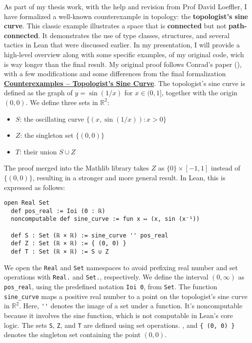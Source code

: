 As part of my thesis work, with the help and revision from Prof David Loeffler,
I have formalized a well-known counterexample in topology: the \textbf{topologist’s sine curve}.
This classic example illustrates a space that is \textbf{connected} but not \textbf{path-connected}.
It demonstrates the use of type classes, structures, and several tactics in Lean that were discussed earlier.
In my presentation, I will provide a high-level overview along with some specific examples,
of my original code, wich is way longer than the final result.
My original proof follows Conrad's paper (\cite{Conrad_connnotpathconn}), with a few modifications
and some differences from the final
formalization \href{https://leanprover-community.github.io/mathlib4_docs/Counterexamples/TopologistsSineCurve.html}{\textbf{Counterexamples – Topologist's Sine Curve}}.
The topologist's sine curve is defined as the graph of $y = \sin(1/x)$ for $x \in (0, 1]$,
together with the origin $(0, 0)$.
We define three sets in $\mathbb{R}^2$:
\begin{itemize}
  \item $S$: the oscillating curve $\{(x, \sin(1/x)) : x > 0\}$
  \item $Z$: the singleton set $\{(0, 0)\}$
  \item $T$: their union $S \cup Z$
\end{itemize}
The proof merged into the Mathlib library takes $Z$ as $\{0\} \times [-1,1]$
instead of $\{(0,0)\}$, resulting in a stronger and more general result.
In Lean, this is expressed as follows:
\begin{lstlisting}[language=lean]
  open Real Set
  def pos_real := Ioi (0 : ℝ)
  noncomputable def sine_curve := fun x ↦ (x, sin (x⁻¹))

  def S : Set (ℝ × ℝ) := sine_curve '' pos_real
  def Z : Set (ℝ × ℝ) := { (0, 0) }
  def T : Set (ℝ × ℝ) := S ∪ Z

\end{lstlisting}
We open the \lstinline[language=lean]|Real| and \lstinline[language=lean]|Set| namespaces
to avoid prefixing real number and set operations with \lstinline[language=lean]|Real.|
and \lstinline[language=lean]|Set.|, respectively.
We define the interval $(0, \infty)$ as \lstinline[language=lean]|pos_real|,
using the predefined notation \lstinline[language=lean]|Ioi 0|, from \lstinline[language=lean]|Set|.
The function \lstinline[language=lean]|sine_curve| maps a positive real number
to a point on the topologist's sine curve in $\mathbb{R}^2$.
Here, \lstinline[language=lean]|''| denotes the image of a set under a function.
It's noncomputable because it involves the sine function,
which is not computable in Lean's core logic.
The sets \lstinline[language=lean]|S|, \lstinline[language=lean]|Z|,
and \lstinline[language=lean]|T|
are defined using set operations.
,
and \lstinline[language=lean]|{ (0, 0) }| denotes the singleton
set containing the point $(0, 0)$.

